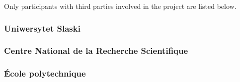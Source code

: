 Only participants with third parties involved in the project are listed below.

\subsubsection{Uniwersytet Slaski}

\subsubsection{Centre National de la Recherche Scientifique}

\subsubsection{\'Ecole polytechnique}






